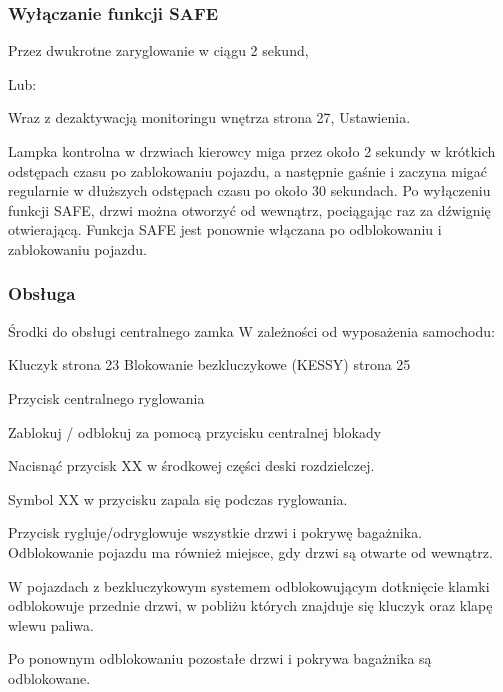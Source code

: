 \subsubsection{Wyłączanie funkcji SAFE}

\begin{itemizeTriangle}
	\itemTriangle Przez dwukrotne zaryglowanie w ciągu 2 sekund,
\end{itemizeTriangle}
Lub:
\begin{itemizeTriangle}
	\itemTriangle Wraz z dezaktywacją monitoringu wnętrza \guillemotright strona 27, Ustawienia.
\end{itemizeTriangle}
Lampka kontrolna w drzwiach kierowcy miga przez około 2 sekundy w krótkich odstępach czasu po zablokowaniu pojazdu, a następnie gaśnie i zaczyna migać regularnie w dłuższych odstępach czasu po około 30 sekundach.
Po wyłączeniu funkcji SAFE, drzwi można otworzyć od wewnątrz, pociągając raz za dźwignię otwierającą.
Funkcja SAFE jest ponownie włączana po odblokowaniu i zablokowaniu pojazdu.


\subsubsection{Obsługa}

Środki do obsługi centralnego zamka
W zależności od wyposażenia samochodu:
\begin{itemizeTriangle}
	\itemTriangle Kluczyk \guillemotright strona 23
	\itemTriangle Blokowanie bezkluczykowe (KESSY) \guillemotright strona 25
\end{itemizeTriangle}
\begin{itemizeTriangle}
	\itemTriangle Przycisk centralnego ryglowania
\end{itemizeTriangle}
Zablokuj / odblokuj za pomocą przycisku centralnej blokady
\begin{itemizeArrow}
	\itemArrow Nacisnąć przycisk XX w środkowej części deski rozdzielczej.
\end{itemizeArrow}
Symbol XX w przycisku zapala się podczas ryglowania.

Przycisk rygluje/odryglowuje wszystkie drzwi i pokrywę bagażnika.
Odblokowanie pojazdu ma również miejsce, gdy drzwi są otwarte od wewnątrz.

W pojazdach z bezkluczykowym systemem odblokowującym dotknięcie klamki odblokowuje przednie drzwi, w pobliżu których znajduje się kluczyk oraz klapę wlewu paliwa.

Po ponownym odblokowaniu pozostałe drzwi i pokrywa bagażnika są odblokowane.

